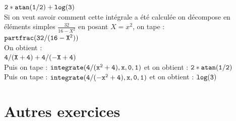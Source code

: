 \documentclass[a4paper,11pt]{book}
\begin{document}
\begin{enumerate}
${\tt 2*atan(1/2)+log(3)}$\\
Si on veut savoir comment cette int\'egrale a \'et\'e calcul\'ee on 
d\'ecompose en \'el\'ements simples $\displaystyle \frac{32}{16-X^2}$ en posant $X=x^2$, 
on tape :\\
${\tt partfrac(32/(16-X^2))}$\\
On obtient :\\
${\tt 4/(X+4)+4/(-X+4)}$\\
Puis on tape :
${\tt integrate(4/(x^2+4),x,0,1)}$ et on obtient :
${\tt 2*atan(1/2)}$\\
Puis on tape :
${\tt integrate(4/(-x^2+4),x,0,1)}$ et on obtient :
${\tt log(3)}$\\
\end{enumerate}
\section{Autres exercices}
\end{document}
